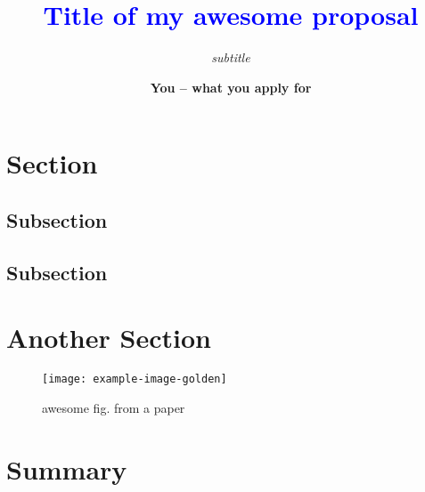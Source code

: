 \documentclass[12pt,letter]{scrartcl}%
\title{\textcolor{blue}{\Large Title of my awesome proposal}\linebreak
   \vspace{-25pt}
 }
\subtitle{\small  \emph{subtitle}}
\author{\normalsize \textbf{You -- what you apply for}}
\date{}
\begin{document}
\maketitle
\vspace*{-50pt}

\section*{Section\,\,}

\lipsum[1-2]

\subsection*{Subsection}

\lipsum[3]

\lipsum[4]

\subsection*{Subsection}

\lipsum[5]

\section*{Another Section\,\,}

\begin{wrapfigure}[13]{R}{.45\textwidth}
  \setlength{\abovecaptionskip}{-4pt}
  \centering
  \texttt{[image: example-image-golden]}
  \vspace*{10pt}
  \caption{awesome fig. from a paper \cite{abadie:10}}
\end{wrapfigure}
\lipsum[6-7]

\section*{Summary\,\,}

\lipsum[7]




\def\aj{AJ }
\def\apj{ApJ }
\def\apss{Astrophys. Space Sci.}
\def\apjl{ApJL }
\def\apjs{ApJS }
\def\aa{A\&A }
\def\aap{A\&A }
\def\araa{ARAA }
\def\mnras{MNRAS }
\def\mnrasl{MNRASL }
\def\cqg{Class. Quantum Grav.}
\def\prl{PRL}



\setlength{\bibsep}{0.7pt}
\end{document}
